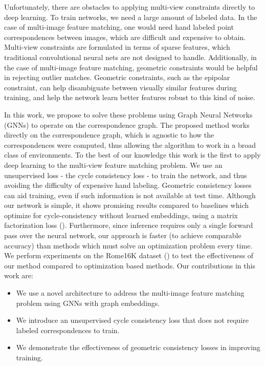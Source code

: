 \documentclass{article} %
\begin{document}
Unfortunately, there are obstacles to applying multi-view constraints directly to deep learning. 
To train networks, we need a large amount of labeled data.
In the case of multi-image feature matching, one would need hand labeled point correspondences between images, which are difficult and expensive to obtain.
Multi-view constraints are formulated in terms of sparse features, which traditional convolutional neural nets are not designed to handle.
Additionally, in the case of multi-image feature matching, geometric constraints would be helpful in rejecting outlier matches.
Geometric constraints, such as the epipolar constraint, can help disambiguate between visually similar features during training, and help the network learn better features robust to this kind of noise.

In this work, we propose to solve these problems using Graph Neural Networks (GNNs) to operate on the correspondence graph.
The proposed method works directly on the correspondence graph, which is agnostic to how the correspondences were computed, thus allowing the algorithm to work in a broad class of environments.
To the best of our knowledge this work is the first to apply deep learning to the multi-view feature matching problem.
We use an unsupervised loss - the cycle consistency loss - to train the network, and thus avoiding the difficulty of expensive hand labeling.
Geometric consistency losses can aid training, even if such information is not available at test time.
Although our network is simple, it shows promising results compared to baselines which optimize for cycle-consistency without learned embeddings, using a matrix factorization loss (\cite{zhou2015multi, leonardos2016distributed}).
Furthermore, since inference requires only a single forward pass over the neural network, our approach is faster (to achieve comparable accuracy) than methods which must solve an optimization problem every time.
We perform experiments on the Rome16K dataset (\cite{li2010location}) to test the effectiveness of our method compared to optimization based methods.
Our contributions in this work are:
\begin{itemize}
\item We use a novel architecture to address the multi-image feature matching problem using GNNs with graph embeddings.
\item We introduce an unsupervised cycle consistency loss that does not require labeled correspondences to train.
\item We demonstrate the effectiveness of geometric consistency losses in improving training.
\end{itemize}
\end{document}
